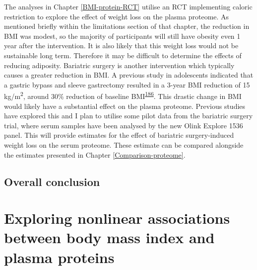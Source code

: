 \documentclass[11pt,twoside]{bristolthesis}
\begin{document}
The analyses in Chapter \ref{BMI-protein-RCT} utilise an RCT implementing caloric restriction to explore the effect of weight loss on the plasma proteome. As mentioned briefly within the limitations section of that chapter, the reduction in BMI was modest, so the majority of participants will still have obesity even 1 year after the intervention. It is also likely that this weight loss would not be sustainable long term. Therefore it may be difficult to determine the effects of reducing adiposity. Bariatric surgery is another intervention which typically causes a greater reduction in BMI. A previous study in adolescents indicated that a gastric bypass and sleeve gastrectomy resulted in a 3-year BMI reduction of 15 kg/m\textsuperscript{2}, around 30\% reduction of baseline BMI\textsuperscript{\protect\hyperlink{ref-Inge2016}{186}}. This drastic change in BMI would likely have a substantial effect on the plasma proteome. Previous studies have explored this and I plan to utilise some pilot data from the bariatric surgery trial, where serum samples have been analysed by the new Olink Explore 1536 panel. This will provide estimates for the effect of bariatric surgery-induced weight loss on the serum proteome. These estimate can be compared alongside the estimates presented in Chapter \ref{Comparison-proteome}.

\hypertarget{overall-conclusion}{%
\section{Overall conclusion}\label{overall-conclusion}}

\appendix

\hypertarget{Appendix-A}{%
\chapter{Exploring nonlinear associations between body mass index and plasma proteins}\label{Appendix-A}}
\end{document}
